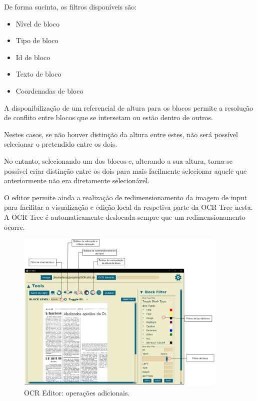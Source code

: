 De forma sucinta, os filtros disponíveis são:

\begin{itemize}\setlength\itemsep{-0.8em}
	\item Nível de bloco
	\item Tipo de bloco
	\item Id de bloco
	\item Texto de bloco
	\item Coordenadas de bloco
\end{itemize}




A disponibilização de um referencial de altura para os blocos permite a resolução de conflito entre blocos que se intersetam ou estão dentro de outros.

Nestes casos, se não houver distinção da altura entre estes, não será possível selecionar o pretendido entre os dois.

No entanto, selecionando um dos blocos e, alterando a sua altura, torna-se possível criar distinção entre os dois para mais facilmente selecionar aquele que anteriormente não era diretamente selecionável.




O editor permite ainda a realização de redimensionamento da imagem de input para facilitar a visualização e edição local da respetiva parte da OCR Tree nesta. A OCR Tree é automaticamente deslocada sempre que um redimensionamento ocorre.


\begin{figure}[H]
	\centering
	\includegraphics[width=0.9\textwidth]{images/ilustracoes/ocr_editor_aditional_operations.png}
	\caption{OCR Editor: operações adicionais.}
	\label{fig:ocr_editor_aditional_operations}
\end{figure}


